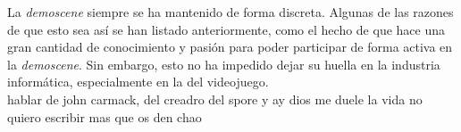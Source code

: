 La \emph{demoscene} siempre se ha mantenido de forma discreta. Algunas de las razones de que esto sea así se han listado anteriormente, como el hecho de que hace una gran cantidad de conocimiento y pasión para poder participar de forma activa en la \emph{demoscene}. Sin embargo, esto no ha impedido dejar su huella en la industria informática, especialmente en la del videojuego.\\

hablar de john carmack, del creadro del spore y ay dios me duele la vida no quiero escribir mas que os den chao







